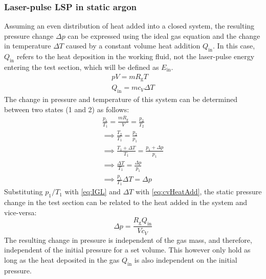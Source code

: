             \subsubsection*{Laser-pulse LSP in static argon}
                Assuming an even distribution of heat added into a closed system, the resulting pressure change $\Delta p$ can be expressed using the ideal gas equation and the change in temperature $\Delta T$ caused by a constant volume heat addition $Q_\mathrm{in}$. In this case, $Q_\mathrm{in}$ refers to the heat deposition in the working fluid, not the laser-pulse energy entering the test section, which will be defined as $E_\mathrm{in}$. 
                \begin{gather}
                    pV = mR_\mathrm{g}T \label{eq:IGL}\\
                    Q_\mathrm{in} = mc_V\Delta T \label{eq:cvHeatAdd}
                \end{gather}
                The change in pressure and temperature of this system can be determined between two states (1 and 2) as follows:
                \begin{gather*}
                    \frac{p_1}{T_1} = \frac{mR_\mathrm{g}}{V} = \frac{p_2}{T_2} \\
                    \implies \frac{T_2}{T_1} = \frac{p_2}{p_1} \\
                    \implies \frac{T_1+\Delta T}{T_1} = \frac{p_1+\Delta p}{p_1} \\
                    \implies \frac{\Delta T}{T_1} = \frac{\Delta p}{p_1} \\
                    \implies \frac{p_1}{T_1}\Delta T = \Delta p
                \end{gather*}
                Substituting $p_1/T_1$ with \autoref{eq:IGL} and $\Delta T$ with \autoref{eq:cvHeatAdd}, the static pressure change in the test section can be related to the heat added in the system and vice-versa:
                \begin{equation}
                    \Delta p = \frac{R_\mathrm{g}Q_\mathrm{in}}{Vc_V}
                \end{equation}
                The resulting change in pressure is independent of the gas mass, and therefore, independent of the initial pressure for a set volume. This however  only hold as long as the heat deposited in the gas $Q_\mathrm{in}$ is also independent on the initial pressure.

